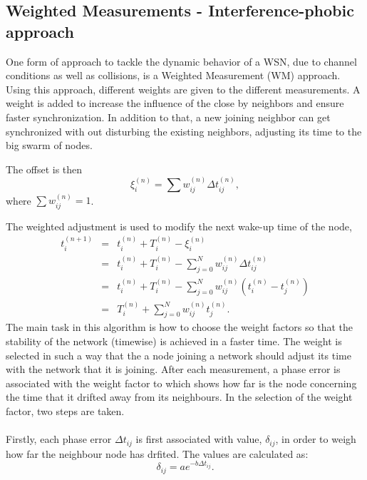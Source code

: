\documentclass[a4paper,10pt]{report}
\begin{document}
\subsection{\textbf{Weighted Measurements - Interference-phobic approach}}
One form of approach to tackle the dynamic behavior of a WSN, due to channel conditions as well as collisions, is a
Weighted Measurement (WM) approach. Using this approach, different
weights are given to the different measurements. A weight is added to
increase the influence of the close by neighbors and ensure
faster synchronization. In addition to that, a new joining neighbor
can get synchronized with out disturbing the existing neighbors,
adjusting its time to the big swarm of nodes.\par
The offset is then
\begin{equation}
\xi_i^{(n)} = \sum{w_{ij}^{(n)}\Delta t_{ij}^{(n)}} ,
\end{equation}
where $\sum{w_{ij}^{(n)}= 1}$.
\par
The weighted adjustment is used to modify the next wake-up time of
the node,
\begin{eqnarray*}
t_i^{(n+1)} &=& t_i^{(n)} + T_i^{(n)} - \xi_i^{(n)} \\ &=& t_i^{(n)}
+ T_i^{(n)} - \sum_{j=0}^N{w_{ij}^{(n)}\Delta t_{ij}^{(n)}} \\ &=&
t_i^{(n)}+ T_i^{(n)} -
\sum_{j=0}^N{w_{ij}^{(n)}(t_i^{(n)}-t_j^{(n)})} \\ &=& T_i^{(n)} + \sum_{j=0}^N{w_{ij}^{(n)}t_j^{(n)}}.
\end{eqnarray*}
The main task in this algorithm is how to choose the weight factors so that the stability of the network (timewise) is achieved in a faster time. The weight is selected in such a way that the a node joining a network should adjust its time with the network that it is joining. After each measurement, a phase error is associated with the weight  factor to which shows how far is the node concerning the time that it drifted away from its neighbours. In the selection of the weight factor, two steps are taken. \paragraph*{}
Firstly, each phase error $\Delta t_{ij}$ is first associated with value, $\delta_{ij}$, in order to weigh how far the neighbour node has drfited. The values are calculated as:
\begin{equation}
\delta_{ij} = ae^{-b\Delta t_{ij}}.
\end{equation}
\end{document}
